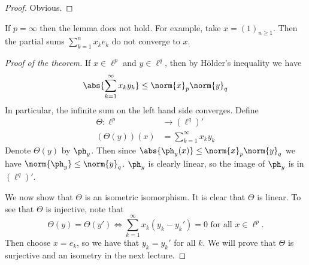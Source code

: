 \begin{proof}
  Obvious.
\end{proof}

\begin{rmk}
  If $p=\infty$ then the lemma does not hold.
  For example, take $x=(1)_{n \geq 1}$.
  Then the partial sums $\sum_{k=1}^n x_ke_k$ do not converge to $x$.
\end{rmk}

\begin{proof}[Proof of the theorem]
  If $x \in \ell^p$ and $y \in \ell^q$, then by H\"older's inequality we have
  \[\abs{\sum_{k=1}^\infty x_ky_k} \leq \norm{x}_p\norm{y}_q\]
  In particular, the infinite sum on the left hand side converges.
  Define
  \begin{align*}
    \Theta: \ell^p &\to (\ell^q)' \\
  (\Theta(y))(x) &= \sum_{k=1}^\infty x_ky_k
  \end{align*}
  Denote $\Theta(y)$ by $\ph_y$.
  Then since $\abs{\ph_y(x)} \leq \norm{x}_p \norm{y}_q$ we have $\norm{\ph_y} \leq \norm{y}_q$.
  $\ph_y$ is clearly linear, so the image of $\ph_y$ is in $(\ell^q)'$.

  We now show that $\Theta$ is an isometric isomorphism.
  It is clear that $\Theta$ is linear.
  To see that $\Theta$ is injective, note that
  \[\Theta(y)=\Theta(y') \iff \sum_{k=1}^\infty x_k(y_k-y_k')=0 \text{ for all } x \in \ell^p.\]
  Then choose $x = e_k$, so we have that $y_k=y_k'$ for all $k$.
  We will prove that $\Theta$ is surjective and an isometry in the next lecture.
\end{proof}
